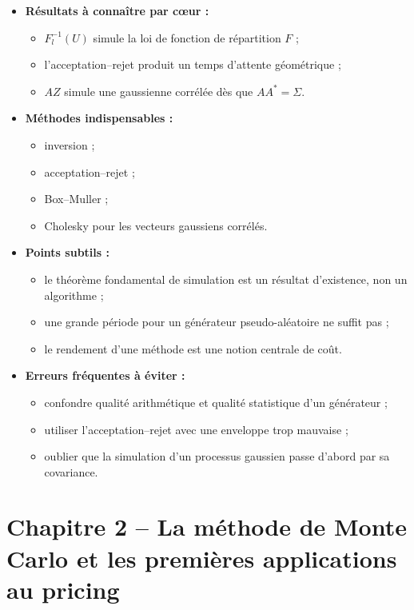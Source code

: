 \documentclass[11pt,a4paper]{article}
\begin{document}
\begin{itemize}
  \item \textbf{Résultats à connaître par cœur :}
  \begin{itemize}
    \item $F_l^{-1}(U)$ simule la loi de fonction de répartition $F$ ;
    \item l'acceptation--rejet produit un temps d'attente géométrique ;
    \item $AZ$ simule une gaussienne corrélée dès que $AA^\ast=\Sigma$.
  \end{itemize}
  \item \textbf{Méthodes indispensables :}
  \begin{itemize}
    \item inversion ;
    \item acceptation--rejet ;
    \item Box--Muller ;
    \item Cholesky pour les vecteurs gaussiens corrélés.
  \end{itemize}
  \item \textbf{Points subtils :}
  \begin{itemize}
    \item le théorème fondamental de simulation est un résultat d'existence, non un algorithme ;
    \item une grande période pour un générateur pseudo-aléatoire ne suffit pas ;
    \item le rendement d'une méthode est une notion centrale de coût.
  \end{itemize}
  \item \textbf{Erreurs fréquentes à éviter :}
  \begin{itemize}
    \item confondre qualité arithmétique et qualité statistique d'un générateur ;
    \item utiliser l'acceptation--rejet avec une enveloppe trop mauvaise ;
    \item oublier que la simulation d'un processus gaussien passe d'abord par sa covariance.
  \end{itemize}
\end{itemize}

\section{Chapitre 2 -- La méthode de Monte Carlo et les premières applications au pricing}
\end{document}
